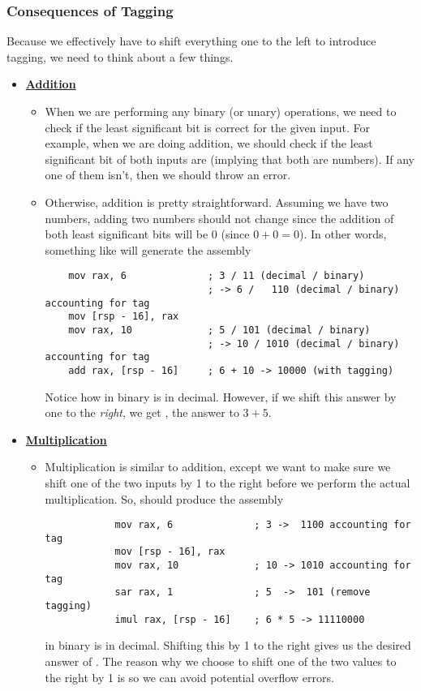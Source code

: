 \documentclass[letterpaper]{article}
\begin{document}
\subsubsection{Consequences of Tagging}
Because we effectively have to shift everything one to the left to introduce tagging, we need to think about a few things.
\begin{itemize}
    \item \underline{\textbf{Addition}}
    \begin{itemize}
        \item When we are performing any binary (or unary) operations, we need to check if the least significant bit is correct for the given input. For example, when we are doing addition, we should check if the least significant bit of both inputs are  (implying that both are numbers). If any one of them isn't, then we should throw an error.
        \item Otherwise, addition is pretty straightforward. Assuming we have two numbers, adding two numbers should not change since the addition of both least significant bits will be 0 (since $0 + 0 = 0$). In other words, something like  will generate the assembly 
        \begin{verbatim}
    mov rax, 6              ; 3 / 11 (decimal / binary)  
                            ; -> 6 /   110 (decimal / binary) accounting for tag
    mov [rsp - 16], rax 
    mov rax, 10             ; 5 / 101 (decimal / binary) 
                            ; -> 10 / 1010 (decimal / binary) accounting for tag 
    add rax, [rsp - 16]     ; 6 + 10 -> 10000 (with tagging)\end{verbatim}
        Notice how  in binary is  in decimal. However, if we shift this answer by one to the \emph{right}, we get , the answer to $3 + 5$.
    \end{itemize}
    \item \underline{\textbf{Multiplication}}
    \begin{itemize}
        \item Multiplication is similar to addition, except we want to make sure we shift one of the two inputs by 1 to the right before we perform the actual multiplication. So,  should produce the assembly
        \begin{verbatim}
            mov rax, 6              ; 3 ->  1100 accounting for tag
            mov [rsp - 16], rax 
            mov rax, 10             ; 10 -> 1010 accounting for tag
            sar rax, 1              ; 5  ->  101 (remove tagging)
            imul rax, [rsp - 16]    ; 6 * 5 -> 11110000\end{verbatim}
         in binary is  in decimal. Shifting this by 1 to the right gives us the desired answer of . The reason why we choose to shift one of the two values to the right by 1 is so we can avoid potential overflow errors.
    \end{itemize}


\end{itemize}
\end{document}
